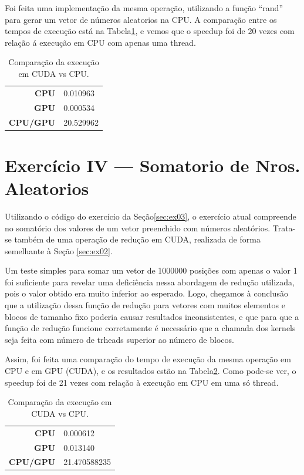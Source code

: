 \documentclass[conference]{IEEEtran}
\begin{document}
Foi feita uma implementação da mesma operação, utilizando a função ``rand'' para gerar um vetor de números aleatorios na CPU.
A comparação entre os tempos de execução está na Tabela\ref{tab:ex03}, e vemos que o speedup foi de 20 vezes com relação á execução em CPU com apenas uma thread.

\begin{table}[htb!]
\centering
\begin{tabular}{rl}
  \bfseries CPU & 0.010963 \\
  \bfseries GPU & 0.000534 \\
  \bfseries CPU/GPU & 20.529962\\
\end{tabular}
\caption{Comparação da execução em CUDA vs CPU.\label{tab:ex03}}
\end{table}

\section{Exercício IV --- Somatorio de Nros. Aleatorios}
Utilizando o código do exercício da Seção\ref{sec:ex03}, o exercício atual compreende no somatório dos valores de um vetor preenchido com números aleatórios. Trata-se também de uma operação de redução em CUDA, realizada de forma semelhante à Seção \ref{sec:ex02}.

Um teste simples para somar um vetor de 1000000 posições com apenas o valor 1 foi suficiente para revelar uma deficiência nessa abordagem de redução utilizada, pois o valor obtido era muito inferior ao esperado.
Logo, chegamos à conclusão que a utilização dessa função de redução para vetores com muitos elementos e blocos de tamanho fixo poderia causar resultados inconsistentes, e que para que a função de redução funcione corretamente é necessário que a chamada dos kernels seja feita com número de trheads superior ao número de blocos.


Assim, foi feita uma comparação do tempo de execução da mesma operação em CPU e em GPU (CUDA), e os resultados estão na Tabela\ref{tab:ex04}. Como pode-se ver, o speedup foi de 21 vezes com relação à execução em CPU em uma só thread.

\begin{table}[htb!]
\centering
\begin{tabular}{rl}
  \bfseries CPU & 0.000612 \\
  \bfseries GPU & 0.013140 \\
  \bfseries CPU/GPU & 21.470588235\\
\end{tabular}
\caption{Comparação da execução em CUDA vs CPU.\label{tab:ex04}}
\end{table}
\end{document}
